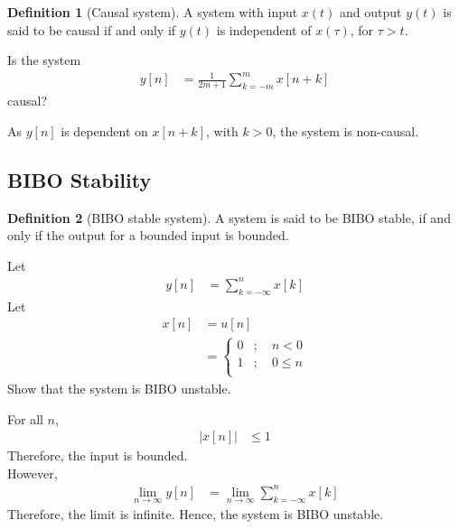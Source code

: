 \documentclass[titlepage, fleqn, a4paper, 12pt, twoside]{article}
\theoremstyle{definition}
\newtheorem{definition}{Definition}
\theoremstyle{theorem}
\begin{document}
\begin{definition}[Causal system]
	A system with input $x(t)$ and output $y(t)$ is said to be causal if and only if $y(t)$ is independent of $x(\tau)$, for $\tau > t$.
\end{definition}

\begin{question}
	Is the system
	\begin{align*}
		y[n] & = \frac{1}{2 m + 1} \sum\limits_{k = -m}^{m} x[n + k]
	\end{align*}
	causal?
\end{question}

\begin{solution}
	As $y[n]$ is dependent on $x[n + k]$, with $k > 0$, the system is non-causal.
\end{solution}

\subsection{BIBO Stability}

\begin{definition}[BIBO stable system]
	A system is said to be BIBO stable, if and only if the output for a bounded input is bounded.
\end{definition}

\begin{question}
	Let
	\begin{align*}
		y[n] & = \sum\limits_{k = -\infty}^{n} x[k]
	\end{align*}
	Let
	\begin{align*}
		x[n] &= u[n]\\
		&=
			\begin{cases}
				0 & ;\quad n < 0   \\
				1 & ;\quad 0 \le n \\
			\end{cases}
	\end{align*}
	Show that the system is BIBO unstable.
\end{question}

\begin{solution}
	For all $n$,
	\begin{align*}
		\left| x[n] \right| & \le 1
	\end{align*}
	Therefore, the input is bounded.\\
	However,
	\begin{align*}
		\lim\limits_{n \to \infty} y[n] & = \lim\limits_{n \to \infty} \sum\limits_{k = -\infty}^{n} x[k]
	\end{align*}
	Therefore, the limit is infinite.
	Hence, the system is BIBO unstable.
\end{solution}
\end{document}
